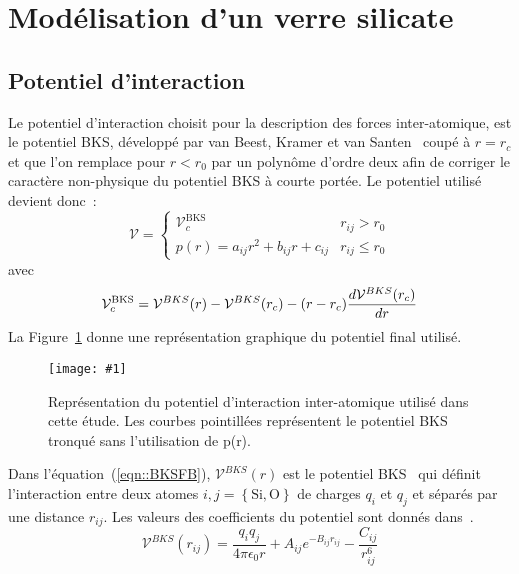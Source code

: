 \documentclass[aps,10pt,twocolumn]{revtex4}
\newcommand{\mrm}[1]{\ensuremath{\mathrm{#1}}\xspace}
\newlength{\picW}	%
\newcommand{\picA}{270}	%
\newcommand{\picL}[1]{\texttt{[image: \#1]}}
\begin{document}
\section{Mod\'elisation d'un verre silicate}


\subsection{Potentiel d'interaction}
Le potentiel d'interaction choisit pour la description des forces inter-atomique, est le
potentiel BKS, d\'evelopp\'e par van Beest, Kramer et van Santen~\cite{BKS} coup\'e \`a
$r=r_c$ et que l'on remplace pour $r<r_0$ par un polyn\^{o}me d'ordre deux afin de corriger le caract\`ere
non-physique du potentiel BKS \`a courte port\'ee. Le potentiel utilis\'e devient donc~:
\begin{equation}
\mathcal{V}= 
	\left\{
	\begin{array}{cc}
	\mathcal{V}^{\mrm{BKS}}_c &r_{ij} > r_0 \\
	p(r) = a_{ij}r^2 + b_{ij}r + c_{ij}					&r_{ij} \leq r_0
	\end{array}
	\right.
\label{eqn::BKSFB}
\end{equation}
avec
\begin{equation}
\mathcal{V}^{\mrm{BKS}}_c = \mathcal{V}^{BKS}(r) - \mathcal{V}^{BKS}(r_c) - (r-r_c)\frac{d\mathcal{V}^{BKS}(r_c)}{dr}\\
\end{equation}
La Figure~\ref{fig::BKSFB} donne une repr\'esentation graphique du potentiel final utilis\'e.
\begin{figure}
\picW=7cm
\picL{potBKS.ps}
\caption{Repr\'esentation du potentiel d'interaction inter-atomique utilis\'e dans cette
\'etude. Les courbes pointill\'ees repr\'esentent le potentiel BKS tronqu\'e sans l'utilisation
de p(r).}
\label{fig::BKSFB}
\end{figure}
Dans l'\'equation~(\ref{eqn::BKSFB}), $\mathcal{V}^{BKS}(r)$ est le potentiel BKS~\cite{BKS} qui d\'efinit l'interaction entre
deux atomes $i,j=\left\{\mrm{Si},\mrm{O}\right\}$ de charges $q_i$ et $q_j$ et s\'epar\'es par
une distance $r_{ij}$. Les valeurs des coefficients du potentiel sont donn\'es dans~\cite{BKS}.
\begin{equation}
\mathcal{V}^{BKS}(r_{ij}) = \frac{q_iq_j}{4\pi \epsilon_0 r} +A_{ij}e^{-B_{ij}r_{ij}} - \frac{C_{ij}}{r^6_{ij}} 
\end{equation}
\end{document}
